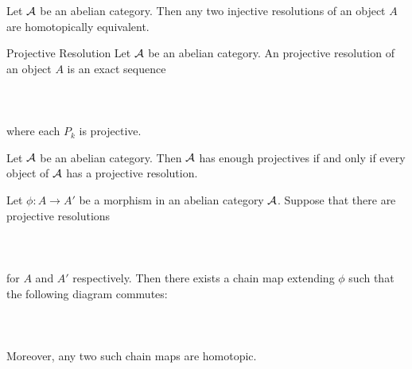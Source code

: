 \documentclass[a4paper]{article}
\begin{document}
\begin{lmm}{}{} Let $\mathcal{A}$ be an abelian category. Then any two injective resolutions of an object $A$ are homotopically equivalent. 
\end{lmm}

\begin{defn}{Projective Resolution}{} Let $\mathcal{A}$ be an abelian category. An projective resolution of an object $A$ is an exact sequence \\~\\
\\~\\
where each $P_k$ is projective. 
\end{defn}

\begin{thm}{}{} Let $\mathcal{A}$ be an abelian category. Then $\mathcal{A}$ has enough projectives if and only if every object of $\mathcal{A}$ has a projective resolution. 
\end{thm}

\begin{prp}{}{} Let $\phi:A\to A'$ be a morphism in an abelian category $\mathcal{A}$. Suppose that there are projective resolutions \\~\\
\\~\\
for $A$ and $A'$ respectively. Then there exists a chain map extending $\phi$ such that the following diagram commutes: \\~\\
\\~\\
Moreover, any two such chain maps are homotopic. 
\end{prp}
\end{document}
